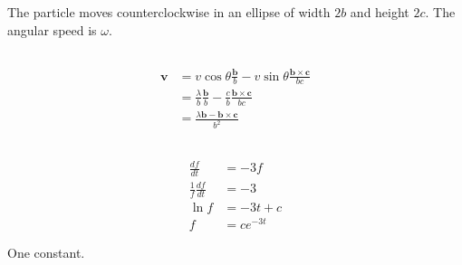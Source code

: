 \documentclass{article}
\renewcommand{\vec}[1]{\boldsymbol{\mathbf{#1}}}
\begin{document}
\setcounter{subsection}{10}
\subsection{}

The particle moves counterclockwise in an ellipse of width $2 b$ and height $2 c$. The angular speed is $\omega$.

\setcounter{subsection}{22}
\subsection{}

\begin{align*}
  \vec{v} & = v \cos \theta \frac{\vec{b}}{b} - v \sin \theta \frac{\vec{b} \times \vec{c}}{b c}   \\
          & = \frac{\lambda}{b} \frac{\vec{b}}{b} - \frac{c}{b} \frac{\vec{b} \times \vec{c}}{b c} \\
          & = \frac{\lambda \vec{b} - \vec{b} \times \vec{c}}{b^2}
\end{align*}

\setcounter{subsection}{24}
\subsection{}

\begin{align*}
  \frac{d f}{d t}             & = -3 f       \\
  \frac{1}{f} \frac{d f}{d t} & = -3         \\
  \ln f                       & = -3 t + c   \\
  f                           & = c e^{-3 t}
\end{align*}

One constant.

\setcounter{subsection}{34}
\subsection{}
\end{document}
